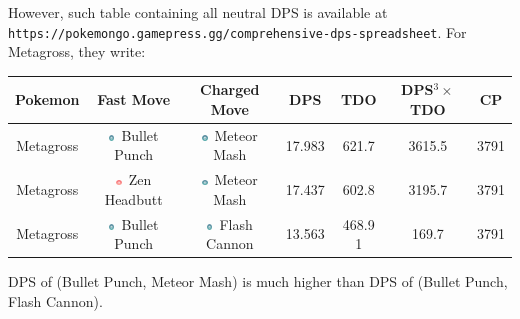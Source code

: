 \documentclass[8pt,aspectratio=169,compress]{beamer}
\newcommand{\psysimp}{\includegraphics[height=0.15cm]{../../images/type/simplified/psy.png}}
\newcommand{\steelsimp}{\includegraphics[height=0.15cm]{../../images/type/simplified/steel.png}}
\begin{document}
\begin{frame}
\begin{block}{}
\begin{tiny}
\begin{itemize}
However, such table containing all neutral DPS is available at \texttt{https://pokemongo.gamepress.gg/comprehensive-dps-spreadsheet}. For Metagross, they write:
\begin{center}
\begin{tabular}{ccccccc}
Pokemon & Fast Move & Charged Move & DPS & TDO & DPS$^3 \times$ TDO & CP \\ \hline
Metagross	 & \steelsimp~Bullet Punch	& \steelsimp~Meteor Mash&	17.983	&621.7	&3615.5	&3791\\
Metagross	& \psysimp~Zen Headbutt	& \steelsimp~Meteor Mash	&17.437	&602.8	&3195.7&	3791\\
Metagross	& \steelsimp~Bullet Punch	& \steelsimp~Flash Cannon&	13.563	&468.9	1&169.7&	3791\\
\end{tabular}
\end{center}

DPS of (Bullet Punch, Meteor Mash) is much higher than DPS of (Bullet Punch, Flash Cannon).
\end{itemize}

\end{tiny}
\end{block}
\end{frame}
\end{document}
